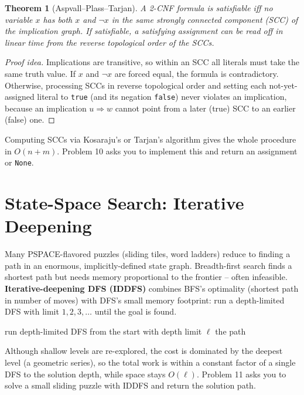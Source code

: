 \documentclass[11pt]{article}
\newtheorem{theorem}{Theorem}[section]
\begin{document}
\begin{theorem}[Aspvall--Plass--Tarjan]
A 2-CNF formula is satisfiable iff no variable $x$ has both $x$ and $\lnot x$
in the same strongly connected component (SCC) of the implication graph. If
satisfiable, a satisfying assignment can be read off in linear time from the
reverse topological order of the SCCs.
\end{theorem}

\begin{proof}[Proof idea]
Implications are transitive, so within an SCC all literals must take the same
truth value. If $x$ and $\lnot x$ are forced equal, the formula is
contradictory. Otherwise, processing SCCs in reverse topological order and
setting each not-yet-assigned literal to \texttt{true} (and its negation
\texttt{false}) never violates an implication, because an implication
$u \Rightarrow w$ cannot point from a later (true) SCC to an earlier (false)
one.
\end{proof}

Computing SCCs via Kosaraju's or Tarjan's algorithm gives the whole procedure
in $O(n+m)$. Problem 10 asks you to implement this and return an assignment or
\texttt{None}.

\section{State-Space Search: Iterative Deepening}

Many PSPACE-flavored puzzles (sliding tiles, word ladders) reduce to finding a
path in an enormous, implicitly-defined state graph. Breadth-first search finds
a shortest path but needs memory proportional to the frontier -- often
infeasible. \textbf{Iterative-deepening DFS (IDDFS)} combines BFS's optimality
(shortest path in number of moves) with DFS's small memory footprint: run a
depth-limited DFS with limit $1, 2, 3, \dots$ until the goal is found.

\begin{algorithm}[h]
\caption{Iterative-Deepening DFS}
\begin{algorithmic}[1]
    \State run depth-limited DFS from the start with depth limit $\ell$
     \Return the path \EndIf
\EndFor
\end{algorithmic}
\end{algorithm}

Although shallow levels are re-explored, the cost is dominated by the deepest
level (a geometric series), so the total work is within a constant factor of a
single DFS to the solution depth, while space stays $O(\ell)$. Problem 11 asks
you to solve a small sliding puzzle with IDDFS and return the solution path.
\end{document}
